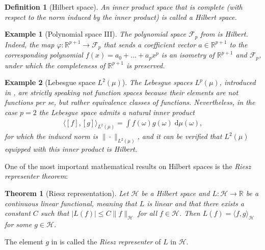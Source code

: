 \documentclass[12pt,paper=letter]{scrreprt}
\newtheorem{theorem}{Theorem}[chapter]
\newtheorem{definition}{Definition}[chapter]
\newtheorem{example}{Example}[chapter]
\begin{document}
\begin{definition}[Hilbert space]
An inner product space that is complete (with respect to the norm induced by the inner product) is called a \emph{Hilbert space}.
\end{definition}

\begin{example}[Polynomial space III] \label{ex: inner prod poly}
The polynomial space $\mathcal{F}_p$ from  is Hilbert.
Indeed, the map $\varphi : \mathbb{R}^{p+1} \rightarrow \mathcal{F}_p$ that sends a coefficient vector $a \in \mathbb{R}^{p+1}$ to the corresponding polynomial $f(x) = a_0 + \dots + a_p x^p$ is an isometry of $\mathbb{R}^{p+1}$ and $\mathcal{F}_p$, under which the completeness of $\mathbb{R}^{p+1}$ is preserved.
\end{example}

\begin{example}[Lebesgue space $L^2(\mu)$]
    \label{ex: Leb is Hilb}
    The Lebesgue spaces $L^p(\mu)$, introduced in , are strictly speaking \emph{not} function spaces because their elements are not functions \emph{per se}, but rather equivalence classes of functions.
    Nevertheless, in the case $p = 2$ the Lebesgue space admits a natural inner product
    \begin{align*}
        \langle [f] , [g] \rangle_{L^2(\mu)} = \int f(\omega) g(\omega) \; \mathrm{d}\mu(\omega) ,
    \end{align*}
    for which the induced norm is $\|\cdot\|_{L^2(\mu)}$, and it can be verified that $L^2(\mu)$ equipped with this inner product is Hilbert.
\end{example}

One of the most important mathematical results on Hilbert spaces is the \emph{Riesz representer theorem}:

\begin{theorem}[Riesz representation] \label{thm: Riesz}
Let $\mathcal{H}$ be a Hilbert space and $L : \mathcal{H} \rightarrow \mathbb{R}$ be a continuous linear functional, meaning that $L$ is linear and that there exists a constant $C$ such that $|L(f)| \leq C \|f\|_{\mathcal{H}}$ for all $f \in \mathcal{H}$.
Then $L(f) = \langle f , g \rangle_{\mathcal{H}}$ for some $g \in \mathcal{H}$.
\end{theorem}

\noindent The element $g$ in  is called the \emph{Riesz representer} of $L$ in $\mathcal{H}$.
\end{document}
